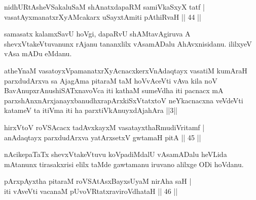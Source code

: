 
\begin{shl}
nidhURtAsheVSakaluSaM shAnatxdapaRM samiVkaSxyX tatf | \\
vasatAyx\s \s manatxrXyAMcakarx uSayxtAmiti pAthiRvaH \hfill|| 44 || 
\end{shl}

\begin{artha}
samasatx kalamxSavU hoVgi, dapaRvU shAMtavAgiruva A 
shevxVtakeVtuvanunx rAjanu tananxlilx vAsamADalu AhAvxnisidanu. 
ililxyeV vAsa mADu eMdanu.
\end{artha}


\begin{shl}
atheYnaM vasatoyxVpamanatxrXyAcnacxkerxV\s nAdaqtayx vasatiM kumAraH parxdudArxva sa AjagAma pitaraM taM hoVvAceVti vAva kila noV BavAnupxrAnushiSATxnavoVca iti kathaM sumeVdha iti pacnacx mA parxshAnxnArxjanayxbanudhxrapArxkiSxVtatxtoV neYkacnacxna veVdeVti katameV ta itiVma iti ha parxtiVkAnuyxdAjahAra ||3||
\end{shl}


\begin{shl}
hirxVtoV roVSAcacx tadAvxkayxM vasatayxthaRmudiVritamf | \\
anAdaqtayx parxdudArxva yatArx\s \s setxV gwtamaH pitA \hfill|| 45 || 
\end{shl}

\begin{artha}
nAcikepaTaTx shevxVtakeVtuvu koVpadiMdalU vAsamADalu heVLida mAtanunx 
tirasakxrisi elilx taMde gawtamanu iruvano alilxge ODi hoVdanu.
\end{artha}

\begin{shl}
pArxpAyxtha pitaraM roVSAtAsxBayxsUyaM nirAha saH | \\
iti \footnotemark[1]vAveVti vacanaM pUvoVRtatxraviroVdhataH \hfill|| 46 || 
\end{shl}

